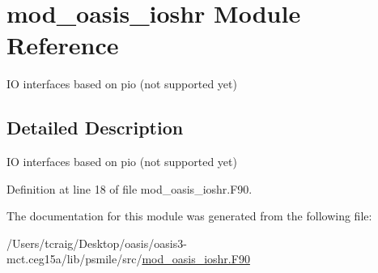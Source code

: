 \hypertarget{classmod__oasis__ioshr}{\section{mod\+\_\+oasis\+\_\+ioshr Module Reference}
\label{classmod__oasis__ioshr}
}


I\+O interfaces based on pio (not supported yet)  




\subsection{Detailed Description}
I\+O interfaces based on pio (not supported yet) 

Definition at line 18 of file mod\+\_\+oasis\+\_\+ioshr.\+F90.



The documentation for this module was generated from the following file\+:\begin{DoxyCompactItemize}
\item 
/\+Users/tcraig/\+Desktop/oasis/oasis3-\/mct.\+ceg15a/lib/psmile/src/\hyperlink{mod__oasis__ioshr_8_f90}{mod\+\_\+oasis\+\_\+ioshr.\+F90}\end{DoxyCompactItemize}

